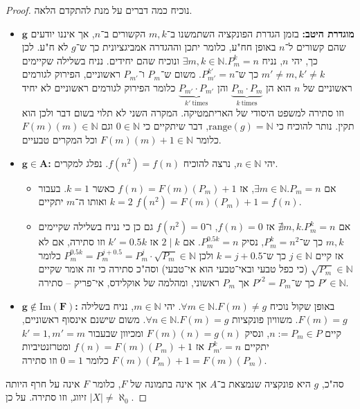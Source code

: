 \documentclass[]{article}
\newcommand\N     {\mathbb{N}}
\newcommand\Img   {\mathrm{Im}}
\newcommand\range {\mathrm{range}}
\newcommand\az    {\aleph_0}
\begin{document}
\begin{proof}
		נוכיח כמה דברים על מנת להתקדם הלאה. 
		\begin{itemize}
			\item $\bm{g}$ \textbf{מוגדרת היטב: }בזמן הגדרת הפונקציה השתמשנו ב־$m, k$ הקשורים ב־$n$, אך איננו יודעים שהם קשורים ל־$n$ באופן חח"ע, כלומר יתכן וההגדרה אמביגציונית כך ש־$g$ לא ח"ע. לכן כך, יהי $n$, נניח $\exists m, k \in \N. P_m^k = n$ ונוכיח שהם יחידים. נניח בשלילה שקיימים $m' \neq m, k' \neq k$ כך ש־$P_{m'}^{k'} = n$. משום ש־$P_m$ ו־$P_{m'}$ ראשוניים, הפירוק לגורמים ראשוניים של $n$ הוא הן $\underbrace{P_m \cdot P_m}_{k \ \mathrm{times}}$ והן $\underbrace{P_{m'} \cdot P_{m'}}_{k' \ \mathrm{times}}$ כלומר הפירוק לגורמים ראשוניים לא יחיד וזו סתירה למשפט היסודי של האריתמטיקה. המקרה השני לא תלוי בשום דבר ולכן הוא תקין. נותר להוכיח כי $\range(g) = \N$, דבר שיתקיים כי $0 \in \N$ וגם $F(m)(m) \in \N$ כלומר $F(m)(m) + 1 \in \N$ וכל המקרים טבעיים. 
			\item $\bm{g \in A}$\textbf{: }יהי $n \in \N$, נרצה להוכיח $f(n^2) = f(n)$. נפלג למקרים. 
			\begin{itemize}
				\item אם $\exists m \in \N. P_m = n$, אז $f(n) = F(m)(P_m) + 1$ כאשר $k = 1$. בעבור $k = 2$ ואותו ה־$m$ יתקיים $f(n^2) = F(m)(P_m) + 1 = f(n)$.
				\item אם $\nexists m, k. P_m^k = n$ אז $f(n) = 0$, ו־$f(n^2) = 0$ גם כן כי נניח בשלילה שקיימים $m, k$ כך ש־$P_m^k = n^2$, נסיק $P_m^{0.5k} = n$. אם $2 \mid k$ אז $k' = 0.5k$ וזו סתירה, אם לא אז קיים $j \in \N$ כך ש־$k = j + 0.5$ ולכן $P_m^{0.5k} = P_m^{j + 0.5} = P_m^j \cdot \sqrt{P_m} \in \N$ כלומר $\sqrt{P_m} \in \N$ (כי כפל טבעי ובאי־טבעי הוא אי־טבעי) וסה"כ סתירה כי זה אומר שקיים $P' \in \N$ כך ש־$P'^2 = P_m$ אך $P_m$ ראשוני, ומהלמה של אוקלידס, אי־פריק – סתירה. 
			\end{itemize}
			\item $\bm{g \notin \Img(F)}$\textbf{: }באופן שקול נוכיח $\forall m \in \N. F(m) \neq g$. יהי $m \in \N$, נניח בשלילה $F(m) = g$. משוויון פונקציות $\forall n \in \N. F(m) = g$. משום שישנם אינסוף ראשוניים, קיים $n := P_m \in P$, ונסיק $F(m)(n) = g(n)$ ומכיוון שבעבור $k' = 1, m' = m$ יתקיים $P_{m'}^k = n$ אז $f(n) = F(m)(P_m) + 1$ ומטרזנטיביות $F(m)(P_m) + 1 = F(m)(P_m)$ כלומר $0 = 1$ וזו סתירה. 
		\end{itemize}
		
		סה"כ, $g$ היא פונקציה שנמצאת ב־$A$ אך אינה בתמונה של $F$, כלומר $F$ אינה על חרף היותה זיווג, וזו סתירה. על כן $|X| \neq \az$. 
	\end{proof}
\end{document}
